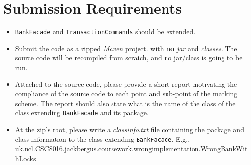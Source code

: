 \documentclass{article}
\begin{document}
	\section*{Submission Requirements}
	\begin{itemize}
		\item \texttt{BankFacade} and \texttt{TransactionCommands} should be extended.
		\item Submit the code as a zipped \textit{Maven} project. with \textbf{no} \textit{jar} and \textit{classes}. The source code will be recompiled from scratch, and no jar/class is going to be run.
		 
		\item Attached to the source code, please provide a short report motivating the compliance of the source code to each point and sub-point of the marking scheme. The report should also state what is the name of the class of the class extending \texttt{BankFacade} and its package.
		
		\item At the zip's root, please write a \textit{classinfo.txt} file containing the package and class information to the class extending \texttt{BankFacade}. E.g., \\
		
		uk.ncl.CSC8016.jackbergus.coursework.wrongimplementation.WrongBankWithLocks

	\end{itemize}
\end{document}
